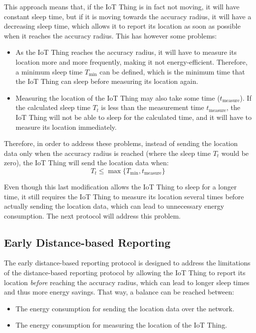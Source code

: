 This approach means that, if the IoT Thing is in fact not moving, it will have constant sleep time, but if it is moving towards the accuracy radius, it will have a decreasing sleep time, which allows it to report its location as soon as possible when it reaches the accuracy radius. This has however some problems:
\begin{itemize}
    \item As the IoT Thing reaches the accuracy radius, it will have to measure its location more and more frequently, making it not energy-efficient. Therefore, a minimum sleep time $T_{\min}$ can be defined, which is the minimum time that the IoT Thing can sleep before measuring its location again.
    \item Measuring the location of the IoT Thing may also take some time ($t_{\text{measure}}$). If the calculated sleep time $T_t$ is less than the measurement time $t_{\text{measure}}$, the IoT Thing will not be able to sleep for the calculated time, and it will have to measure its location immediately.
\end{itemize}

Therefore, in order to address these problems, instead of sending the location data only when the accuracy radius is reached (where the sleep time $T_t$ would be zero), the IoT Thing will send the location data when:
\begin{equation*}
    T_t \leq \max\{T_{\min}, t_{\text{measure}}\}
\end{equation*}

Even though this last modification allows the IoT Thing to sleep for a longer time, it still requires the IoT Thing to measure its location several times before actually sending the location data, which can lead to unnecessary energy consumption. The next protocol will address this problem.

\subsection{Early Distance-based Reporting}

The early distance-based reporting protocol is designed to address the limitations of the distance-based reporting protocol by allowing the IoT Thing to report its location \emph{before} reaching the accuracy radius, which can lead to longer sleep times and thus more energy savings. That way, a balance can be reached between:
\begin{itemize}
    \item The energy consumption for sending the location data over the network.
    \item The energy consumption for measuring the location of the IoT Thing.
\end{itemize}

